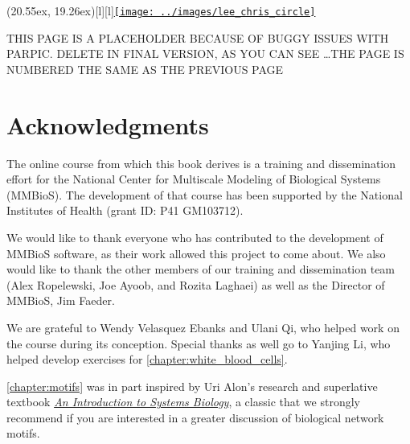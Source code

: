 \vspace{2.5\baselineskip}

\parpic(20.55ex, 19.26ex)[l][l]{\href{http://cseweb.ucsd.edu/~ppevzner/}{\texttt{[image: ../images/lee\_chris\_circle]}}}
\vspace{0.85ex}


 \clearpage
 \vspace{4.44ex}
 THIS PAGE IS A PLACEHOLDER BECAUSE OF BUGGY ISSUES WITH PARPIC.  DELETE IN FINAL VERSION, AS YOU CAN SEE \ldots THE PAGE IS NUMBERED THE SAME AS THE PREVIOUS PAGE\addtocounter{page}{-1}
 

 
\clearpage
{}
\chapter{Acknowledgments}
\label{chapter:acknowledgments}

The online course from which this book derives is a training and dissemination effort for the National Center for Multiscale Modeling of Biological Systems (MMBioS). The development of that course has been supported by the National Institutes of Health (grant ID: P41 GM103712).

We would like to thank everyone who has contributed to the development of MMBioS software, as their work allowed this project to come about. We also would like to thank the other members of our training and dissemination team (Alex Ropelewski, Joe Ayoob, and Rozita Laghaei) as well as the Director of MMBioS, Jim Faeder.

We are grateful to Wendy Velasquez Ebanks and Ulani Qi, who helped work on the course during its conception. Special thanks as well go to Yanjing Li, who helped develop exercises for \autoref{chapter:white_blood_cells}. 

\autoref{chapter:motifs} was in part inspired by Uri Alon’s research and superlative textbook \href{https://www.weizmann.ac.il/mcb/UriAlon/introduction-systems-biology-design-principles-biological-circuits}{\textit{An Introduction to Systems Biology}}, a classic that we strongly recommend if you are interested in a greater discussion of biological network motifs.

